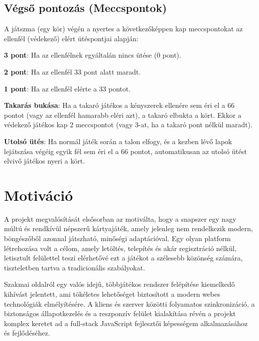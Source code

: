\subsection{Végső pontozás (Meccspontok)}
A játszma (egy kör) végén a nyertes a következőképpen kap meccspontokat az ellenfél (védekező) elért ütéspontjai alapján:
\begin{compactitem}
    \item \textbf{3 pont}: Ha az ellenfélnek egyáltalán nincs ütése (0 pont).
    \item \textbf{2 pont}: Ha az ellenfél 33 pont alatt maradt.
    \item \textbf{1 pont}: Ha az ellenfél elérte a 33 pontot.
    \item \textbf{Takarás bukása}: Ha a takaró játékos a kényszerek ellenére sem éri el a 66 pontot (vagy az ellenfél hamarabb eléri azt), a takaró elbukta a kört. Ekkor a védekező játékos kap 2 meccspontot (vagy 3-at, ha a takaró pont nélkül maradt).
    \item \textbf{Utolsó ütés}: Ha normál játék során a talon elfogy, és a kezben lévő lapok lejátszása végéig egyik fél sem éri el a 66 pontot, automatikusan az utolsó ütést elvivő játékos nyeri a kört.
\end{compactitem}

\section{Motiváció}
A projekt megvalósítását elsősorban az motiválta, hogy a snapszer egy nagy múltú és rendkívül népszerű kártyajáték, amely jelenleg nem rendelkezik modern, böngészőből azonnal játszható, minőségi adaptációval. Egy olyan platform létrehozása volt a célom, amely letöltés, telepítés és akár regisztráció nélkül, letisztult felülettel teszi elérhetővé ezt a játékot a szélesebb közönség számára, tiszteletben tartva a tradicionális szabályokat.

Szakmai oldalról egy valós idejű, többjátékos rendszer felépítése kiemelkedő kihívást jelentett, ami tökéletes lehetőséget biztosított a modern webes technológiák elmélyítésére. A kliens és szerver közötti folyamatos szinkronizáció, a biztonságos állapotkezelés és a reszponzív felület kialakítása révén a projekt komplex keretet ad a full-stack JavaScript fejlesztői képességem alkalmazásához és fejlődéséhez.